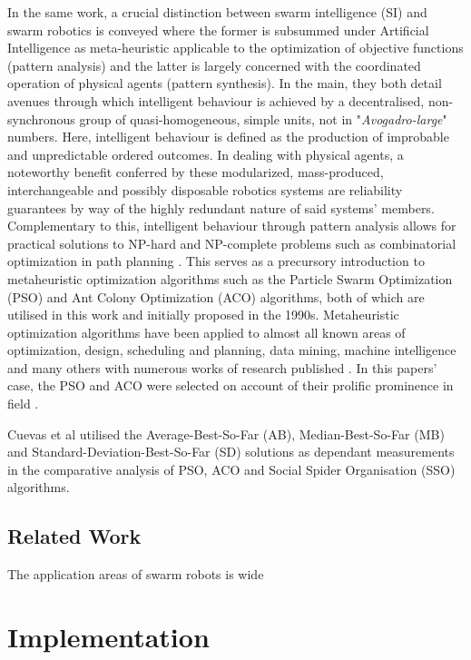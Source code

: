 \documentclass{report}
\begin{document}
In the same work, a crucial distinction between swarm intelligence (SI) and swarm robotics is conveyed where the former is subsummed under Artificial Intelligence as meta-heuristic applicable to the optimization of objective functions (pattern analysis) and the latter is largely concerned with the coordinated operation of physical agents (pattern synthesis). In the main, they both detail avenues through which intelligent behaviour is achieved by a decentralised, non-synchronous group of quasi-homogeneous, simple units, not in "\textit{Avogadro-large}" numbers. Here, intelligent behaviour is defined as the production of improbable and unpredictable ordered outcomes. In dealing with physical agents, a noteworthy benefit conferred by these modularized, mass-produced, interchangeable and possibly disposable robotics systems are reliability guarantees by way of the highly redundant nature of said systems' members. Complementary to this, intelligent behaviour through pattern analysis allows for practical solutions to NP-hard and NP-complete problems such as combinatorial optimization in path planning \cite{Yan2012}. This serves as a precursory introduction to metaheuristic optimization algorithms such as the Particle Swarm Optimization (PSO) \cite{Kennedy1995} and Ant Colony Optimization (ACO) \cite{Dorigo1997} algorithms, both of which are utilised in this work and initially proposed in the 1990s. Metaheuristic optimization algorithms have been applied to almost all known areas of optimization, design, scheduling and planning, data mining, machine intelligence and many others with numerous works of research published \cite{Yang2011}. In this papers' case, the PSO and ACO were selected on account of their prolific prominence in field \cite{Selvi2010}.

Cuevas et al \cite{Cuevas2013} utilised the Average-Best-So-Far (AB), Median-Best-So-Far (MB) and Standard-Deviation-Best-So-Far (SD) solutions as dependant measurements in the comparative analysis of PSO, ACO and Social Spider Organisation (SSO) algorithms.

\section{Related Work}
The application areas of swarm robots is wide 

\chapter{Implementation} \label{implementation}
\end{document}
